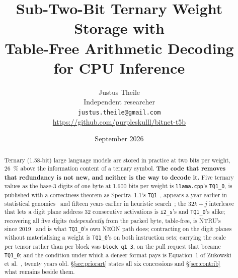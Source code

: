 \documentclass[11pt,a4paper]{article}
\title{Sub-Two-Bit Ternary Weight Storage with\\
       Table-Free Arithmetic Decoding for CPU Inference}
\author{Justus Theile\\
  \small Independent researcher\\
  \small \texttt{justus.theile@gmail.com}\\
  \small \url{https://github.com/purpleskulll/bitnet-t5b}}
\date{September 2026}
\newcommand{\code}[1]{\texttt{#1}}
\begin{document}
\maketitle

\begin{abstract}
Ternary (1.58-bit) large language models are stored in practice at two bits per
weight, \SI{26}{\percent} above the information content of a ternary symbol.
\textbf{The code that removes that redundancy is not new, and neither is the way
to decode it.} Five ternary values as the base-3 digits of one byte at
\num{1.600} bits per weight is \code{llama.cpp}'s \code{TQ1\_0}, is published
with a correctness theorem as Spectra~1.1's \code{TQ1}~\cite{spectra}, appears a
year earlier in statistical genomics~\cite{miraculix} and fifteen years earlier
in heuristic search~\cite{breyerkorf}; the $32k+j$ interleave that lets a digit
plane address 32 consecutive activations is \code{i2\_s}'s and \code{TQ1\_0}'s
alike; recovering all five digits
\emph{independently} from the packed byte, table-free, is NTRU's since
2019~\cite{ntru} and is what \code{TQ1\_0}'s own NEON path does; contracting on
the digit planes without materialising a weight is \code{TQ1\_0}'s on both
instruction sets; carrying the scale per tensor rather than per block was
\code{block\_q1\_3}, on the pull request that became \code{TQ1\_0}; and the
condition under which a denser format pays is Equation~1 of Zukowski et
al.~\cite{zukowski}, twenty years old. \S\ref{sec:priorart} states all six
concessions and \S\ref{sec:contrib} what remains beside them.


\end{abstract}
\end{document}
